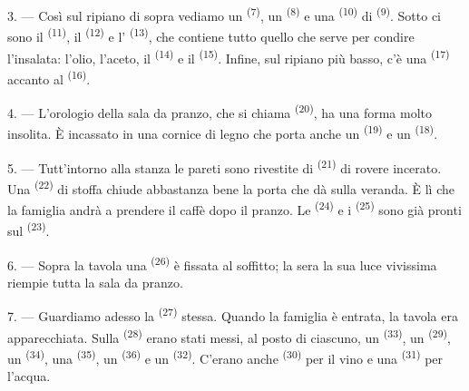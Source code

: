 3. --- Così sul ripiano di sopra vediamo un 
\textsuperscript{(7)}, un  \textsuperscript{(8)} e una 
\textsuperscript{(10)} di  \textsuperscript{(9)}. Sotto ci sono il
 \textsuperscript{(11)}, il  \textsuperscript{(12)} e
l' \textsuperscript{(13)}, che contiene tutto quello che serve per
condire l'insalata: l'olio, l'aceto, il  \textsuperscript{(14)} e il
 \textsuperscript{(15)}. Infine, sul ripiano più basso, c'è una
 \textsuperscript{(17)} accanto al 
\textsuperscript{(16)}.

4. --- L'orologio della sala da pranzo, che si chiama 
\textsuperscript{(20)}, ha una forma molto insolita. È incassato in una cornice di
legno che porta anche un  \textsuperscript{(19)} e un
 \textsuperscript{(18)}.

\VUsaut{4.6mm}
\VUsaut{3.0mm}

5. --- Tutt'intorno alla stanza le pareti sono rivestite di 
\textsuperscript{(21)} di rovere incerato. Una 
\textsuperscript{(22)} di stoffa chiude abbastanza bene la porta che dà sulla veranda.
È lì che la famiglia andrà a prendere il caffè dopo il pranzo. Le 
\textsuperscript{(24)} e i  \textsuperscript{(25)} sono già pronti sul
 \textsuperscript{(23)}.

6. --- Sopra la tavola una  \textsuperscript{(26)} è
fissata al soffitto; la sera la sua luce vivissima riempie tutta la sala da pranzo.

7. --- Guardiamo adesso la  \textsuperscript{(27)} stessa. Quando la
famiglia è entrata, la tavola era apparecchiata. Sulla 
\textsuperscript{(28)} erano stati messi, al posto di ciascuno, un 
\textsuperscript{(33)}, un  \textsuperscript{(29)}, un
 \textsuperscript{(34)}, una 
\textsuperscript{(35)}, un  \textsuperscript{(36)} e un
 \textsuperscript{(32)}. C'erano anche 
\textsuperscript{(30)} per il vino e una  \textsuperscript{(31)} per
l'acqua.

